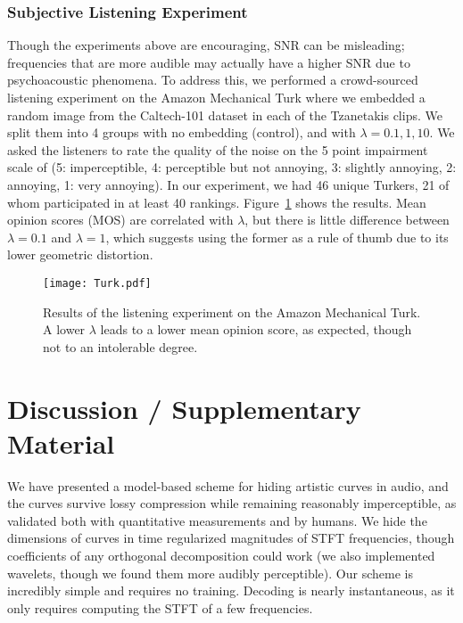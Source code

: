 \documentclass[runningheads]{llncs}
\begin{document}
\subsubsection{Subjective Listening Experiment}


Though the experiments above are encouraging, SNR can be misleading; frequencies that are more audible may actually have a higher SNR due to psychoacoustic phenomena.  To address this, we performed a crowd-sourced listening experiment on the Amazon Mechanical Turk where we embedded a random image from the Caltech-101 dataset in each of the Tzanetakis clips.  We split them into 4 groups with no embedding (control), and with $\lambda = 0.1, 1, 10$.  We asked the listeners to rate the quality of the noise on the 5 point impairment scale of \cite{bassia2001robust} (5: imperceptible, 4: perceptible but not annoying, 3: slightly annoying, 2: annoying, 1: very annoying).  In our experiment, we had 46 unique Turkers, 21 of whom participated in at least 40 rankings.  Figure~\ref{fig:TurkResults} shows the results.  Mean opinion scores (MOS) are correlated with $\lambda$, but there is little difference between $\lambda=0.1$ and $\lambda=1$, which suggests using the former as a rule of thumb due to its lower geometric distortion.




\begin{figure}
  \begin{minipage}[c]{0.36\textwidth}
    \caption{
      Results of the listening experiment on the Amazon Mechanical Turk.  A lower $\lambda$ leads to a lower mean opinion score, as expected, though not to an intolerable degree.
    } \label{fig:TurkResults}
  \end{minipage}
  \begin{minipage}[c]{0.64\textwidth}
    \texttt{[image: Turk.pdf]}
  \end{minipage}\hfill
  
\end{figure}

\section{Discussion / Supplementary Material}

We have presented a model-based scheme for hiding artistic curves in audio, and the curves survive lossy compression while remaining reasonably imperceptible, as validated both with quantitative measurements and by humans.  We hide the dimensions of curves in time regularized magnitudes of STFT frequencies, though coefficients of any orthogonal decomposition could work (we also implemented wavelets, though we found them more audibly perceptible).  Our scheme is incredibly simple and requires no training.  Decoding is nearly instantaneous, as it only requires computing the STFT of a few frequencies. 
\end{document}
